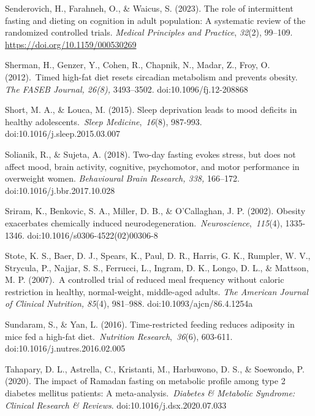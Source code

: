 \documentclass[authordate, empirical]{jote-new-article}
\begin{document}
Senderovich, H., Farahneh, O., \& Waicus, S. (2023). The role of intermittent fasting and dieting on cognition in adult population: A systematic review of the randomized controlled trials. \emph{Medical Principles and Practice}, \emph{32}(2), 99--109. \href{https://doi.org/10.1159/000530269}{https://doi.org/10.1159/000530269}



Sherman, H., Genzer, Y., Cohen, R., Chapnik, N., Madar, Z., Froy, O. (2012). Timed high-fat diet resets circadian metabolism and prevents obesity.\emph{ The FASEB Journal, 26(8), }3493--3502. doi:10.1096/fj.12-208868



Short, M. A., \& Louca, M. (2015). Sleep deprivation leads to mood deficits in healthy adolescents. \emph{Sleep Medicine}, \emph{16}(8), 987-993. doi:10.1016/j.sleep.2015.03.007



Solianik, R., \& Sujeta, A. (2018). Two-day fasting evokes stress, but does not affect mood, brain activity, cognitive, psychomotor, and motor performance in overweight women. \emph{Behavioural Brain Research, 338,} 166--172. doi:10.1016/j.bbr.2017.10.028



Sriram, K., Benkovic, S. A., Miller, D. B., \& O'Callaghan, J. P. (2002). Obesity exacerbates chemically induced neurodegeneration. \emph{Neuroscience}, \emph{115}(4), 1335-1346. doi:10.1016/s0306-4522(02)00306-8



Stote, K. S., Baer, D. J., Spears, K., Paul, D. R., Harris, G. K., Rumpler, W. V., Strycula, P., Najjar, S. S., Ferrucci, L., Ingram, D. K., Longo, D. L., \& Mattson, M. P. (2007). A controlled trial of reduced meal frequency without caloric restriction in healthy, normal-weight, middle-aged adults.\emph{ The American Journal of Clinical Nutrition, 85}(4), 981--988. doi:10.1093/ajcn/86.4.1254a



Sundaram, S., \& Yan, L. (2016). Time-restricted feeding reduces adiposity in mice fed a high-fat diet. \emph{Nutrition Research}, \emph{36}(6), 603-611. doi:10.1016/j.nutres.2016.02.005



Tahapary, D. L., Astrella, C., Kristanti, M., Harbuwono, D. S., \& Soewondo, P. (2020). The impact of Ramadan fasting on metabolic profile among type 2 diabetes mellitus patients: A meta-analysis. \emph{Diabetes \& Metabolic Syndrome: Clinical Research \& Reviews}. doi:10.1016/j.dsx.2020.07.033
\end{document}
